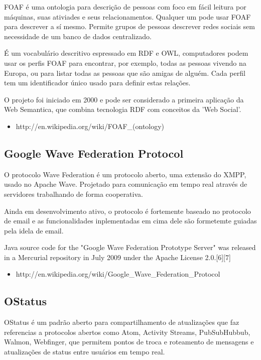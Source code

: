 \documentclass[12pt]{article}
\begin{document}
FOAF é uma ontologia para descrição de pessoas com foco em fácil leitura por
máquinas, suas ativiades e seus relacionamentos. Qualquer um pode usar FOAF
para descrever a sí mesmo. Permite grupos de pessoas descrever redes sociais
sem necessidade de um banco de dados centralizado.

É um vocabulário descritivo espressado em RDF e OWL, computadores podem
usar os perfis FOAF para encontrar, por exemplo, todas as pessoas vivendo na
Europa, ou para listar todas as pessoas que são amigas de alguém. Cada perfil
tem um identificador único usado para definir estas relações.

O projeto foi iniciado em 2000 e pode ser considerado a primeira aplicação da
Web Semantica, que combina tecnologia RDF com conceitos da 'Web Social'.

\begin{itemize}
  \item http://en.wikipedia.org/wiki/FOAF\_(ontology)
\end{itemize}

\subsection{Google Wave Federation Protocol}

O protocolo Wave Federation é um protocolo aberto, uma extensão do XMPP, usado
no Apache Wave. Projetado para comunicação em tempo real através de servidores
trabalhando de forma cooperativa.

Ainda em desenvolvimento ativo, o protocolo é fortemente baseado no protocolo
de email e as funcionalidades inplementadas em cima dele são formetemte
guiadas pela idela de email.

Java source code for the "Google Wave Federation Prototype Server" was
released in a Mercurial repository in July 2009 under the Apache License
2.0.[6][7]

\begin{itemize}
  \item http://en.wikipedia.org/wiki/Google\_Wave\_Federation\_Protocol
\end{itemize}

\subsection{OStatus}

OStatus é um padrão aberto para compartilhamento de atualizações que faz
referencias a protocolos abertos como Atom, Activity Streams, PubSubHubbub,
Walmon, Webfinger, que permitem pontos de troca e roteamento de mensagens e
atualizações de status entre usuários em tempo real.
\end{document}
